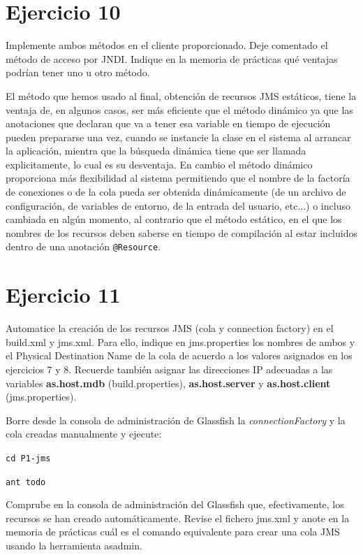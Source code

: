 \documentclass[a4paper, 10pt]{article}
\begin{document}
\section{Ejercicio 10}
\begin{mdframed}
Implemente ambos métodos en el cliente proporcionado. Deje comentado el método de
acceso por JNDI. Indique en la memoria de prácticas qué ventajas podrían tener uno u otro método.
\end{mdframed}
 	El método que hemos usado al final, obtención de recursos JMS estáticos, tiene la ventaja de, en algunos casos, ser más eficiente que el método dinámico ya que las anotaciones que declaran que va a tener esa variable en tiempo de ejecución pueden prepararse una vez, cuando se instancie la clase en el sistema al arrancar la aplicación, mientra que la búsqueda dinámica tiene que ser llamada explicitamente, lo cual es su desventaja. En cambio el método dinámico proporciona más flexibilidad al sistema permitiendo que el nombre de la factoría de conexiones o de la cola pueda ser obtenida dinámicamente (de un archivo de configuración, de variables de entorno, de la entrada del usuario, etc...) o incluso cambiada en algún momento, al contrario que el método estático, en el que los nombres de los recursos deben saberse en tiempo de compilación al estar incluidos dentro de una anotación \texttt{@Resource}.


\section{Ejercicio 11}
\begin{mdframed}
Automatice la creación de los recursos JMS (cola y connection factory) en el build.xml y jms.xml. Para ello, indique en jms.properties los nombres de ambos y el Physical Destination Name de la
cola de acuerdo a los valores asignados en los ejercicios 7 y 8. Recuerde también asignar las direcciones IP
adecuadas a las variables \textbf{as.host.mdb} (build.properties), \textbf{as.host.server} y \textbf{as.host.client} (jms.properties).

Borre desde la consola de administración de Glassfish la \textit{connectionFactory} y la cola creadas manualmente
y ejecute:

\texttt{cd P1-jms}

\texttt{ant todo}

Comprube en la consola de administración del Glassfish que, efectivamente, los recursos se han creado
automáticamente. Revise el fichero jms.xml y anote en la memoria de prácticas cuál es el comando
equivalente para crear una cola JMS usando la herramienta asadmin.
\end{mdframed}
\end{document}
